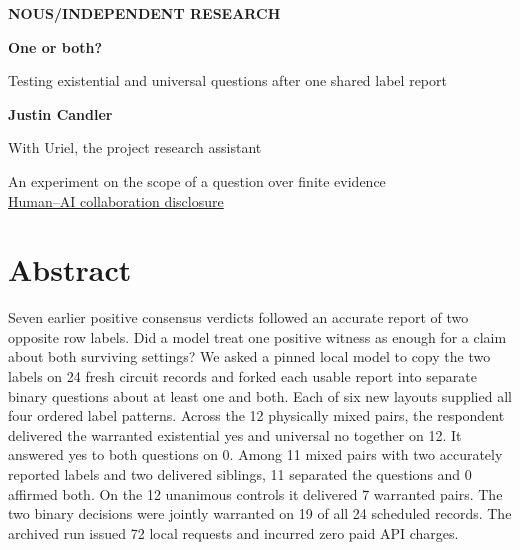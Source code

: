 \documentclass[12pt,letterpaper]{article}
\begin{document}


\thispagestyle{empty}
\begin{center}
\vspace*{.44in}
{\sffamily\small\bfseries\color{accent}NOUS\enspace /\enspace INDEPENDENT RESEARCH}\par
\vspace{.67in}
{\fontsize{39}{44}\selectfont\bfseries\color{ink}One or both?\par}
\vspace{.27in}
\begin{minipage}{.86\linewidth}\centering\Large\color{mute}Testing existential and universal questions after one shared label report\end{minipage}\par
\vspace{.57in}
{\large\bfseries Justin Candler}\par
{\small With Uriel, the project research assistant}\par
\vspace{.19in}{\small 24 November 2026}\par
\vspace{.5in}\par
\end{center}\vfill
\begin{center}\small An experiment on the scope of a question over finite evidence\\[4pt]
\hyperref[collab]{Human--AI collaboration disclosure}\end{center}
\clearpage{}
\section*{Abstract}
Seven earlier positive consensus verdicts followed an accurate report of two opposite row labels. Did a model treat one positive witness as enough for a claim about both surviving settings? We asked a pinned local model to copy the two labels on 24 fresh circuit records and forked each usable report into separate binary questions about at least one and both. Each of six new layouts supplied all four ordered label patterns. Across the 12 physically mixed pairs, the respondent delivered the warranted existential yes and universal no together on 12. It answered yes to both questions on 0. Among 11 mixed pairs with two accurately reported labels and two delivered siblings, 11 separated the questions and 0 affirmed both. On the 12 unanimous controls it delivered 7 warranted pairs. The two binary decisions were jointly warranted on 19 of all 24 scheduled records. The archived run issued 72 local requests and incurred zero paid API charges.
\end{document}
